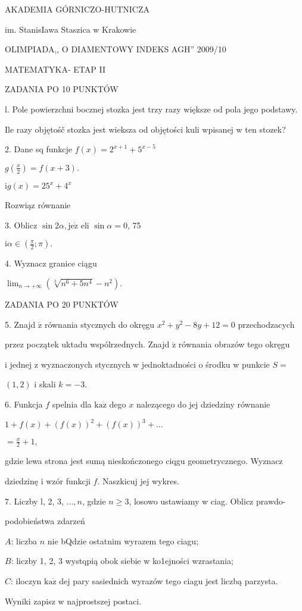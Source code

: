 \documentclass[a4paper,12pt]{article}
\begin{document}
AKADEMIA GÓRNICZO-HUTNICZA

im. StanisIawa Staszica w Krakowie

OLIMPIADA,, O DIAMENTOWY INDEKS AGH'' 2009/10

MATEMATYKA- ETAP II

ZADANIA PO 10 PUNKTÓW

l. Pole powierzchni bocznej stozka jest trzy razy większe od pola jego podstawy.

Ile razy objętośč stozka jest wieksza od objętości kuli wpisanej w ten stozek?

2. Dane sq funkcje $f(x) =2^{x+1}+5^{x-5}$

$g(\displaystyle \frac{x}{2})=f(x+3).$

$\mathrm{i} g(x) =25^{x}+4^{x}$

Rozwiąz równanie

3. Oblicz $\sin 2\alpha, \mathrm{j}\mathrm{e}\dot{\mathrm{z}}$ eli $\sin\alpha=0$, 75

$\mathrm{i} \displaystyle \alpha\in(\frac{\pi}{2};\pi).$

4. Wyznacz granice ciągu

$\displaystyle \lim_{n\rightarrow+\infty}(\sqrt[3]{n^{6}+5n^{4}}-n^{2}).$

ZADANIA PO 20 PUNKTÓW

5. Znajd $\acute{\mathrm{z}}$ równania stycznych do okręgu $x^{2}+y^{2}-8y+12=0$ przechodzacych

przez początek uktadu wspólrzednych. Znajd $\acute{\mathrm{z}}$ równania obrazów tego okręgu

i jednej z wyznaczonych stycznych w jednoktadności o środku w punkcie $S=$

$(1,2)$ i skali $k=-3.$

6. Funkcja $f$ spelnia dla $\mathrm{k}\mathrm{a}\dot{\mathrm{z}}$ dego $x$ nalezącego do jej dziedziny równanie

$ 1+f(x)+(f(x))^{2}+(f(x))^{3}+\ldots$

$= \displaystyle \frac{x}{2}+1,$

gdzie lewa strona jest sumą nieskończonego ciqgu geometrycznego. Wyznacz

dziedzinę i wzór funkcji $f$. Naszkicuj jej wykres.

7. Liczby l, 2, 3, $\ldots, n$, gdzie $n\geq 3$, losowo ustawiamy w ciag. Oblicz prawdo-

podobieństwa zdarzeń

$A$: liczba $n$ nie bQdzie ostatnim wyrazem tego ciagu;

$B$: liczby 1, 2, 3 wystqpią obok siebie w ko1ejności wzrastania;

$C$: iloczyn $\mathrm{k}\mathrm{a}\dot{\mathrm{z}}$ dej pary sasiednich wyrazów tego ciagu jest liczbą parzysta.

Wyniki zapisz w najprostszej postaci.
\end{document}
